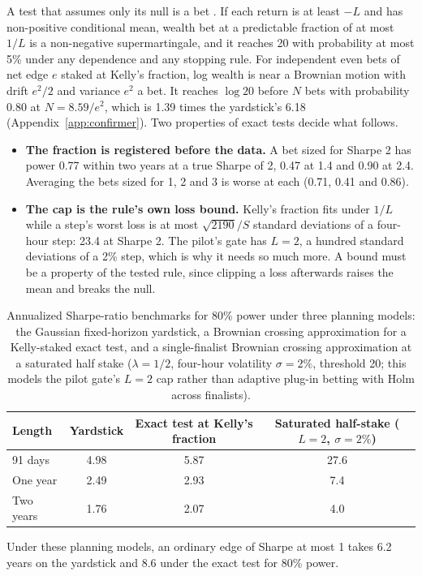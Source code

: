 \documentclass[11pt]{article}
\begin{document}
A test that assumes only its null is a bet \cite{ville1939,kelly1956,shafer2021,waudbysmith2024}. If each return is at least $-L$ and has non-positive conditional mean, wealth bet at a predictable fraction of at most $1/L$ is a non-negative supermartingale, and it reaches 20 with probability at most 5\% under any dependence and any stopping rule. For independent even bets of net edge $e$ staked at Kelly's fraction, log wealth is near a Brownian motion with drift $e^2/2$ and variance $e^2$ a bet. It reaches $\log 20$ before $N$ bets with probability 0.80 at $N=8.59/e^2$, which is 1.39 times the yardstick's 6.18 (Appendix~\ref{app:confirmer}). Two properties of exact tests decide what follows.
\begin{itemize}
  \item \textbf{The fraction is registered before the data.} A bet sized for Sharpe 2 has power 0.77 within two years at a true Sharpe of 2, 0.47 at 1.4 and 0.90 at 2.4. Averaging the bets sized for 1, 2 and 3 is worse at each (0.71, 0.41 and 0.86).
  \item \textbf{The cap is the rule's own loss bound.} Kelly's fraction fits under $1/L$ while a step's worst loss is at most $\sqrt{2190}/S$ standard deviations of a four-hour step: 23.4 at Sharpe 2. The pilot's gate has $L=2$, a hundred standard deviations of a 2\% step, which is why it needs so much more. A bound must be a property of the tested rule, since clipping a loss afterwards raises the mean and breaks the null.
\end{itemize}

\begin{table}[ht]
\centering
\small
\begin{tabular}{@{}lccc@{}}
\toprule
Length & Yardstick & Exact test at Kelly's fraction & Saturated half-stake ($L=2$, $\sigma=2\%$) \\
\midrule
91 days & 4.98 & 5.87 & 27.6 \\
One year & 2.49 & 2.93 & 7.4 \\
Two years & 1.76 & 2.07 & 4.0 \\
\bottomrule
\end{tabular}
\caption{Annualized Sharpe-ratio benchmarks for 80\% power under three planning models: the Gaussian fixed-horizon yardstick, a Brownian crossing approximation for a Kelly-staked exact test, and a single-finalist Brownian crossing approximation at a saturated half stake ($\lambda=1/2$, four-hour volatility $\sigma=2\%$, threshold 20; this models the pilot gate's $L=2$ cap rather than adaptive plug-in betting with Holm across finalists).}
\label{tab:wallmatch}
\end{table}
Under these planning models, an ordinary edge of Sharpe at most 1 takes 6.2 years on the yardstick and 8.6 under the exact test for 80\% power.
\end{document}
